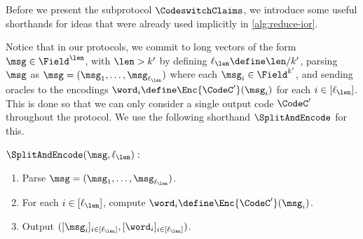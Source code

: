 Before we present the subprotocol $\CodeswitchClaims$, we introduce some useful shorthands for ideas that were already used implicitly in \cref{alg:reduce-ior}.

Notice that in our protocols, we commit to long vectors of the form $\msg \in \Field^{\len}$, with $\len > k'$ by defining $\ell_\len \define \len/ k'$, parsing $\msg$ as $\msg = (\msg_1, \dotsc, \msg_{\ell_\len})$ where each $\msg_i \in \Field^{k'}$, and sending oracles to the encodings $\word_i \define \Enc{\CodeC'}(\msg_i)$ for each $i \in [\ell_\len]$.
This is done so that we can only consider a single output code $\CodeC'$ throughout the protocol. 
We use the following shorthand $\SplitAndEncode$ for this.

\begin{tcolorbox}[breakable, enhanced, colback=white, boxrule=0.65pt]
    $\SplitAndEncode(\msg, \ell_{\len}):$
    \begin{enumerate}[nolistsep]
        \item Parse $\msg = (\msg_1, \dotsc, \msg_{\ell_{\len}})$.
        \item For each $i \in [\ell_{\len}]$, compute $\word_i \define \Enc{\CodeC'}(\msg_i)$.
        \item Output $([\msg_i]_{i \in [\ell_{\len}]}, [\word_i]_{i \in [\ell_{\len}]})$.
    \end{enumerate}
\end{tcolorbox}

